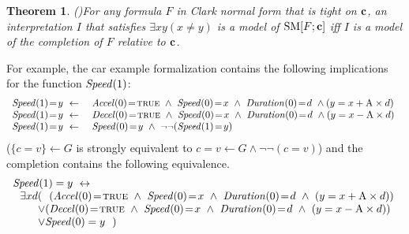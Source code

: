 \documentclass[runningheads]{llncs}
\def\ar{\leftarrow}
\def\beq{\begin{equation}}
\def\eeq#1{\label{#1}\end{equation}}
\def\ba{\begin{array}}
\def\ea{\end{array}}
\def\i#1{\hbox{\it #1\/}}
\def\ar{\leftarrow}
\def\lrar{\leftrightarrow}
\def\sm{\hbox{\rm SM}}
\def\mvis{\!=\!}
\def\true{\hbox{\sc true}}
\newtheorem{thm}{Theorem}
\begin{document}

\begin{thm} (\cite[Theorem~2]{bartholomew13functional})\label{thm:completion}
For any formula $F$ in Clark normal form that is tight on ${\bf c}$,
an interpretation $I$ that satisfies $\exists xy(x \ne y)$ is a model
of $\sm[F;{\bf c}]$ iff $I$ is a model of the completion of $F$
relative to ${\bf c}$.
\end{thm}

For example, the car example formalization contains the following
implications for the function $\i{Speed}(1)$: 
{\small
\[
\ba {rl}
  \i{Speed}(1)\mvis y\ \ar\ & \i{Accel}(0)\mvis\true\ \land\ 
                          \i{Speed}(0)\mvis x\ \land\ 
                          \i{Duration}(0)\mvis d\  
    \land (y = x+{\rm A}\times d)\ \\ %
%
  \i{Speed}(1)\mvis y\ \ar\ & \i{Decel}(0)\mvis\true\ \land\ 
                          \i{Speed}(0)\mvis x\ \land\ 
                          \i{Duration}(0)\mvis d\  
   \land (y = x-{\rm A}\times d)\ \\ %
   \i{Speed}(1)\mvis y\ \ar\ & \i{Speed}(0)\mvis y\ \land\
   \neg\neg(\i{Speed}(1)\mvis y)
\ea 
\]
}
($\{c\mvis v\}\ar G$ is strongly equivalent to $c\mvis v\ar G\land
\neg\neg (c\mvis v)$)
and the completion contains the following equivalence.
{\small
\beq
\ba{l}
\i{Speed}(1)  = y\  \lrar\ \\
~~\exists xd(~~ 
      (\i{Accel}(0)\mvis\true\ \land\ 
      \i{Speed}(0)\mvis x\ \land\ 
      \i{Duration}(0)\mvis d\  
      \land\ (y = x+{\rm A}\times d))\ \\ 
~~~~~~~\lor (\i{Decel}(0)\mvis\true\ \land\ 
      \i{Speed}(0)\mvis x\ \land\ 
      \i{Duration}(0)\mvis d\  
     \land\ (y = x-{\rm A}\times d))\   \\
~~~~~~~\lor \i{Speed}(0)=y ~~)
\ea
\eeq{ex:comp}
}
\end{document}
